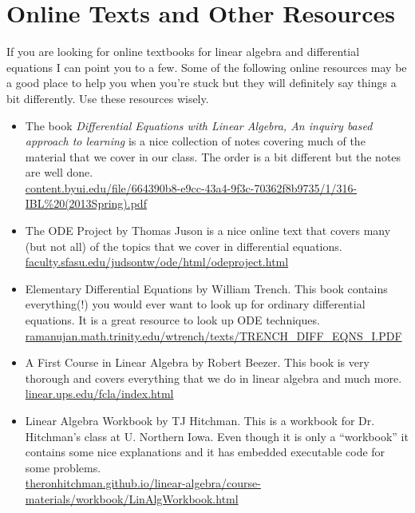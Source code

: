 \section{Online Texts and Other Resources}\label{pref:resources}
If you are looking for online textbooks for linear algebra and differential equations I
can point you to a few.  Some of the following online resources may be a good place to
help you when you're stuck but
they will definitely say things a bit differently. Use these resources wisely.
\begin{itemize}
    \item The book {\it Differential Equations with Linear Algebra, An inquiry based approach
        to learning} is a nice collection of notes covering much of the material that we
        cover in our class.  The order is a bit different but the notes are well done.
        \\\href{https://content.byui.edu/file/664390b8-e9cc-43a4-9f3c-70362f8b9735/1/316-IBL\%20(2013Spring).pdf}{content.byui.edu/file/664390b8-e9cc-43a4-9f3c-70362f8b9735/1/316-IBL\%20(2013Spring).pdf}
    \item The ODE Project by Thomas Juson is a nice online text that covers many (but
        not all) of the topics that we cover in differential equations. \\
        \href{http://faculty.sfasu.edu/judsontw/ode/html/odeproject.html}{faculty.sfasu.edu/judsontw/ode/html/odeproject.html}
    \item Elementary Differential Equations by William Trench.  This book contains
        everything(!) you would ever want to look up for ordinary differential equations.  It is a
        great resource to look up ODE techniques.  \\
        \href{http://ramanujan.math.trinity.edu/wtrench/texts/TRENCH_DIFF_EQNS_I.PDF}{ramanujan.math.trinity.edu/wtrench/texts/TRENCH\_DIFF\_EQNS\_I.PDF}
    \item A First Course in Linear Algebra by Robert Beezer. This book is very thorough
        and covers everything that we do in linear algebra and much more. \\
        \href{http://linear.ups.edu/fcla/index.html}{linear.ups.edu/fcla/index.html}
    \item Linear Algebra Workbook by TJ Hitchman. This is a workbook for Dr. Hitchman's
        class at U. Northern Iowa.  Even though it is only a ``workbook'' it contains some nice explanations and it has
        embedded executable code for some problems. \\
        \href{http://theronhitchman.github.io/linear-algebra/course-materials/workbook/LinAlgWorkbook.html}{theronhitchman.github.io/linear-algebra/course-materials/workbook/LinAlgWorkbook.html}
\end{itemize}

